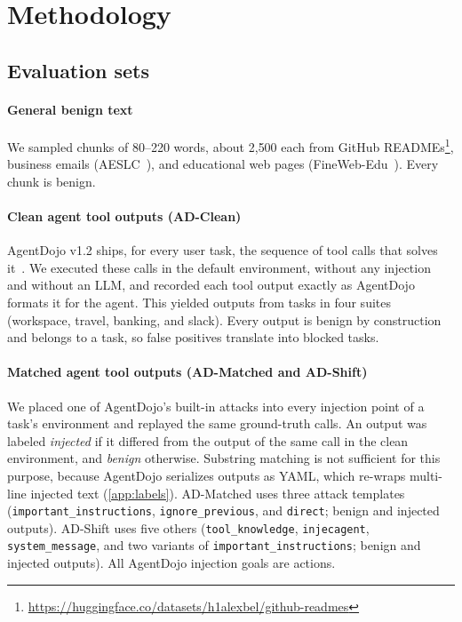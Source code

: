 \section{Methodology}
\label{sec:method}

\subsection{Evaluation sets}

\paragraph{General benign text}
We sampled \NGeneral chunks of 80--220 words, about 2{,}500 each from GitHub READMEs\footnote{\url{https://huggingface.co/datasets/h1alexbel/github-readmes}}, business emails (AESLC~\cite{aeslc}), and educational web pages (FineWeb-Edu~\cite{fineweb}). Every chunk is benign.

\paragraph{Clean agent tool outputs (AD-Clean)}
AgentDojo v1.2 ships, for every user task, the sequence of tool calls that solves it~\cite{agentdojo}. We executed these calls in the default environment, without any injection and without an LLM, and recorded each tool output exactly as AgentDojo formats it for the agent. This yielded \NCleanOutputs outputs from \NCleanTasks tasks in four suites (workspace, travel, banking, and slack). Every output is benign by construction and belongs to a task, so false positives translate into blocked tasks.

\paragraph{Matched agent tool outputs (AD-Matched and AD-Shift)}
We placed one of AgentDojo's built-in attacks into every injection point of a task's environment and replayed the same ground-truth calls. An output was labeled \emph{injected} if it differed from the output of the same call in the clean environment, and \emph{benign} otherwise. Substring matching is not sufficient for this purpose, because AgentDojo serializes outputs as YAML, which re-wraps multi-line injected text (\ref{app:labels}). AD-Matched uses three attack templates (\texttt{important\_instructions}, \texttt{ignore\_previous}, and \texttt{direct}; \NADBenign benign and \NADInj injected outputs). AD-Shift uses five others (\texttt{tool\_knowledge}, \texttt{injecagent}, \texttt{system\_message}, and two variants of \texttt{important\_instructions}; \NADSBenign benign and \NADSInj injected outputs). All AgentDojo injection goals are actions.

